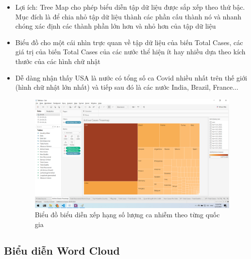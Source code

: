 \documentclass[a4paper, 12pt]{article}
\begin{document}
\begin{itemize}
    \item Lợi ích: Tree Map cho phép biểu diễn tập dữ liệu được sắp xếp theo thứ bậc. Mục đích là để chia nhỏ tập dữ liệu thành các phần cấu thành nó và nhanh chóng xác định các thành phần lớn hơn và nhỏ hơn của tập dữ liệu
    \item Biểu đồ cho một cái nhìn trực quan về tập dữ liệu của biến Total Cases, các giá trị của biến Total Cases của các nước thể hiện ít hay nhiều dựa theo kích thước của các hình chữ nhật
    \item Dễ dàng nhận thấy USA là nước có tổng số ca Covid nhiều nhất trên thế giới (hình chữ nhật lớn nhất) và tiếp sau đó là các nước India, Brazil, France...
    \begin{figure}[H]
        \begin{center}
            \includegraphics[scale=0.4]{img/treeMap.png}
            \caption{Biểu đồ biểu diễn xếp hạng số lượng ca nhiễm theo từng quốc gia}
        \end{center}
    \end{figure}
\end{itemize}

\subsection{Biểu diễn Word Cloud}
\end{document}
